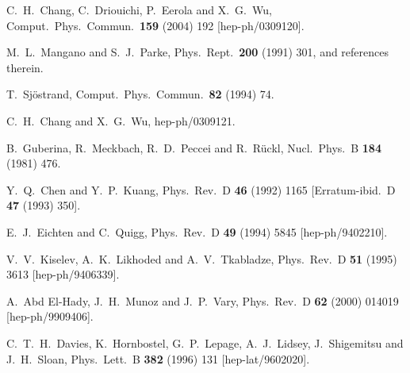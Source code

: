 \begin{thebibliography}{999}
C.~H.~Chang, C.~Driouichi, P.~Eerola and X.~G.~Wu,
Comput.\ Phys.\ Commun.\  {\bf 159} (2004) 192
[hep-ph/0309120].

M.~L.~Mangano and S.~J.~Parke,
Phys.\ Rept.\  {\bf 200} (1991) 301,
and references therein.

T.~Sj\"ostrand,
Comput.\ Phys.\ Commun.\  {\bf 82} (1994) 74.

C.~H.~Chang and X.~G.~Wu,
hep-ph/0309121.

B.~Guberina, R.~Meckbach, R.~D.~Peccei and R.~R\"uckl,
Nucl.\ Phys.\ B {\bf 184} (1981) 476.

Y.~Q.~Chen and Y.~P.~Kuang,
Phys.\ Rev.\ D {\bf 46} (1992) 1165
[Erratum-ibid.\ D {\bf 47} (1993) 350].

E.~J.~Eichten and C.~Quigg,
Phys.\ Rev.\ D {\bf 49} (1994) 5845
[hep-ph/9402210].

V.~V.~Kiselev, A.~K.~Likhoded and A.~V.~Tkabladze,
Phys.\ Rev.\ D {\bf 51} (1995) 3613
[hep-ph/9406339].

A.~Abd El-Hady, J.~H.~Munoz and J.~P.~Vary,
Phys.\ Rev.\ D {\bf 62} (2000) 014019
[hep-ph/9909406].

C.~T.~H.~Davies, K.~Hornbostel, G.~P.~Lepage, A.~J.~Lidsey, 
        J.~Shigemitsu and J.~H.~Sloan,
Phys.\ Lett.\ B {\bf 382} (1996) 131
[hep-lat/9602020].

\end{thebibliography}

